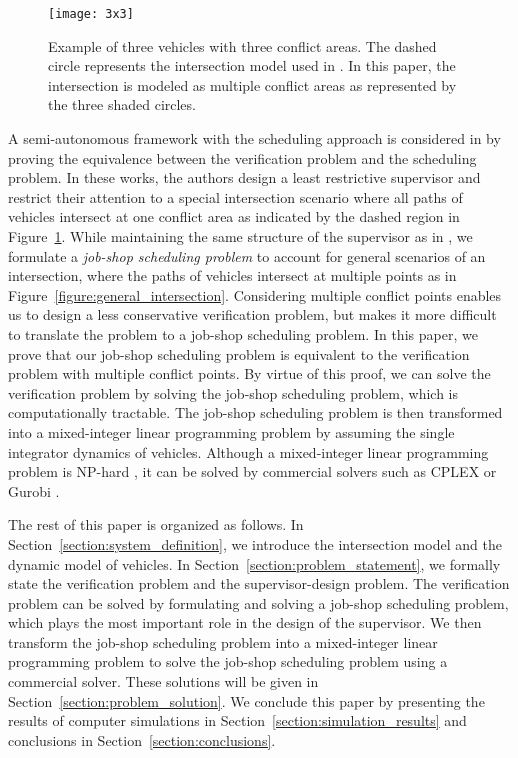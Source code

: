 \documentclass{sig-alternate}
\begin{document}
\begin{figure}[tb!]
\centering
\texttt{[image: 3x3]}
\caption{Example of three vehicles with three conflict areas. The dashed circle represents the intersection model used in \cite{colombo_efficient_2012,colombo_least_2014}. In this paper, the intersection is modeled as multiple conflict areas as represented by the three shaded circles.}
\label{figure:scenario}
\end{figure}
A semi-autonomous framework with the scheduling approach is considered in \cite{colombo_efficient_2012,colombo_least_2014} by proving the equivalence between the verification problem and the scheduling problem. In these works, the authors design a least restrictive supervisor and restrict their attention to a special intersection scenario where all paths of vehicles intersect at one conflict area as indicated by the dashed region in Figure~\ref{figure:scenario}. While maintaining the same structure of the supervisor as in \cite{colombo_efficient_2012,colombo_least_2014}, we formulate a \textit{job-shop scheduling problem} to account for general scenarios of an intersection, where the paths of vehicles intersect at multiple points as in Figure~\ref{figure:general_intersection}. Considering multiple conflict points enables us to design a less conservative verification problem, but makes it more difficult to translate the problem to a job-shop scheduling problem. In this paper, we prove that our job-shop scheduling problem is equivalent to the verification problem with multiple conflict points. By virtue of this proof, we can solve the verification problem by solving the job-shop scheduling problem, which is computationally tractable. The job-shop scheduling problem is then transformed into a mixed-integer linear programming problem by assuming the single integrator dynamics of vehicles. Although a mixed-integer linear programming problem is NP-hard \cite{garey_computers_1979}, it can be solved by commercial solvers such as CPLEX \cite{Cplex_2009} or Gurobi \cite{Gurobi_2014}.
 
The rest of this paper is organized as follows. In Section~\ref{section:system_definition}, we introduce the intersection model and the dynamic model of vehicles. In Section~\ref{section:problem_statement}, we formally state the verification problem and the supervisor-design problem. The verification problem can be solved by formulating and solving a job-shop scheduling problem, which plays the most important role in the design of the supervisor. We then transform the job-shop scheduling problem into a mixed-integer linear programming problem to solve the job-shop scheduling problem using a commercial solver. These solutions will be given in Section~\ref{section:problem_solution}. We conclude this paper by presenting the results of computer simulations in Section~\ref{section:simulation_results} and conclusions in Section~\ref{section:conclusions}.
\end{document}
